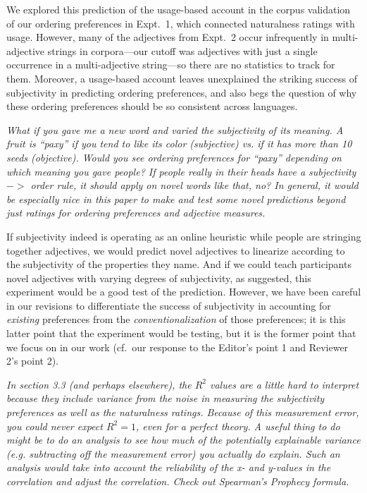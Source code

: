 \documentclass[12pt]{article}
\newcommand{\ndg}[1]{\textcolor{Green}{[ndg: #1]}}
\begin{document}
We explored this prediction of the usage-based account in the corpus validation of our ordering preferences in Expt.~1, which connected naturalness ratings with usage. 
However, many of the adjectives from Expt.~2 occur infrequently in multi-adjective strings in corpora---our cutoff was adjectives with just a single occurrence in a multi-adjective string---so there are no statistics to track for them. Moreover, a usage-based account leaves unexplained the striking success of subjectivity in predicting ordering preferences, and also begs the question of why these ordering preferences should be so consistent across languages.
	
\item \emph{What if you gave me a new word and varied the subjectivity of its meaning. A fruit is ``paxy'' if you tend to like its color (subjective) vs. if it has more than 10 seeds (objective). Would you see ordering preferences for ``paxy'' depending on which meaning you gave people? If people really in their heads have a subjectivity $->$ order rule, it should apply on novel words like that, no? In general, it would be especially nice in this paper to make and test some novel predictions beyond just ratings for ordering preferences and adjective measures.}

If subjectivity indeed is operating as an online heuristic while people are stringing together adjectives, we would predict novel adjectives to linearize according to the subjectivity of the properties they name. And if we could teach participants novel adjectives with varying degrees of subjectivity, as suggested, this experiment would be a good test of the prediction. However, we have been careful in our revisions to differentiate the success of subjectivity in accounting for \emph{existing} preferences from the \emph{conventionalization} of those preferences; it is this latter point that the experiment would be testing, but it is the former point that we focus on in our work (cf.~our response to the Editor's point 1 and Reviewer 2's point 2).


\item \emph{In section 3.3 (and perhaps elsewhere), the $R^2$ values are a little hard to interpret because they include variance from the noise in measuring the subjectivity preferences as well as the naturalness ratings. Because of this measurement error, you could never expect $R^2=1$, even for a perfect theory. A useful thing to do might be to do an analysis to see how much of the potentially explainable variance (e.g. subtracting off the measurement error) you actually do explain. Such an analysis would take into account the reliability of the x- and y-values in the correlation and adjust the correlation. Check out Spearman's Prophecy formula.}
\end{document}
